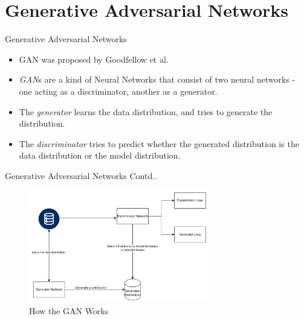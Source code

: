 \documentclass{beamer}
\begin{document}
\section{Generative Adversarial Networks}
\begin{frame}{Generative Adversarial Networks}
    \begin{itemize}
        \item GAN was proposed by Goodfellow et al. \cite{Goodfellow2020}
        \item \textit{GAN}s are a kind of Neural Networks that consist of two neural networks - one acting as a discriminator, another as a generator.
        \item The \textit{generator} learns the data distribution, and tries to generate the distribution.
        \item The \textit{discriminator} tries to predict whether the generated distribution is the data distribution or the model distribution.
    \end{itemize}
\end{frame}
\begin{frame}{Generative Adversarial Networks Contd..}
    \begin{figure}
        \centering
        \includegraphics[width=0.7\textwidth]{../images/GAN.png}
        \caption{How the GAN Works}
        \label{fig:fig-1}
    \end{figure}
\end{frame}
\end{document}
